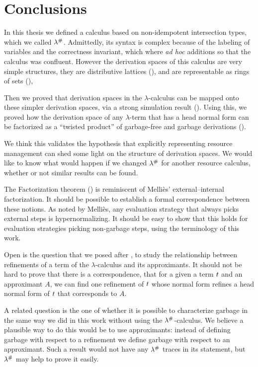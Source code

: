 \chapter{Conclusions}
\label{ch:conclusions}

In this thesis we defined a calculus based on non-idempotent intersection types,
which we called $\lambda^{\mathtt{\#}}$.
Admittedly, its syntax is complex because of the labeling of variables
and the correctness invariant, which where \textit{ad hoc}
additions so that the calculus was confluent.
However the derivation spaces of this calculus are very simple structures,
they are distributive lattices (),
and are representable as rings of sets (),

Then we proved that derivation spaces in the $\lambda$-calculus
can be mapped onto these simpler derivation spaces, via a strong
simulation result ().
Using this, we proved how the derivation space of any $\lambda$-term that has a
head normal form can be factorized as a ``twisted product'' of garbage-free
and garbage derivations ().

We think this validates the hypothesis that explicitly representing resource
management can shed some light on the structure of derivation spaces.
We would like to know what would happen if we changed $\lambda^{\mathtt{\#}}$ for
another resource calculus, whether or not similar results can be found.

The Factorization theorem ()
is reminiscent of Melliès’ \cite{DBLP:conf/ctcs/Mellies97} external--internal
factorization. It should be possible to establish a formal correspondence between these
notions. As noted by Melliès, any evaluation strategy that always picks external steps is
hypernormalizing. It should be easy to show that this holds for evaluation strategies picking
non-garbage steps, using the terminology of this work.

Open is the question that we posed after ,
to study the relationship between refinements of a term of the $\lambda$-calculus
and its approximants.
It should not be hard to prove that there is a correspondence,
\ie that for a given a term $t$ and an approximant $A$,
we can find one refinement of $t$ whose normal form refines a head normal form of $t$
that corresponds to $A$.

A related question is the one of whether it is possible to characterize garbage in the same
way we did in this work without using the $\lambda^{\mathtt{\#}}$-calculus.
We believe a plausible way to do this would be to use approximants:
instead of defining garbage with respect to a refinement we define garbage
with respect to an approximant.
Such a result would not have any $\lambda^{\mathtt{\#}}$ traces in its statement,
but $\lambda^{\mathtt{\#}}$ may help to prove it easily.

